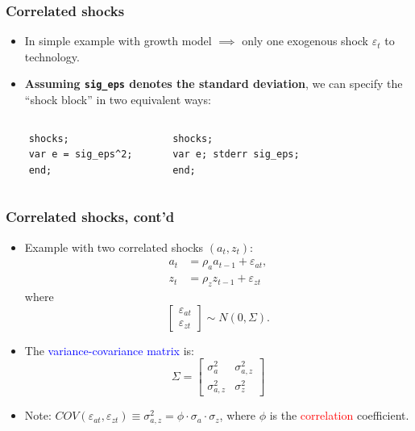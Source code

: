 \documentclass{beamer}
\newcommand{\eps}{\varepsilon}
\begin{document}
\begin{frame}[fragile]
\frametitle{Correlated shocks}

\begin{itemize}
\item In simple example with growth model $\implies $ only one exogenous
shock $\varepsilon _{t}$ to technology.

\item \textbf{Assuming \texttt{sig\_eps} denotes the standard deviation}, we can specify the ``shock block'' in two equivalent ways:
\end{itemize}

\begin{columns}[c]
	
	\begin{verbatim}
	shocks;
	var e = sig_eps^2;
	end;
	\end{verbatim}
	
	\begin{verbatim}
	shocks;
	var e; stderr sig_eps;
	end;
	\end{verbatim}

\end{columns}

\end{frame}

\begin{frame}
\frametitle{Correlated shocks, cont'd}
	\begin{itemize}
		\item Example with two correlated shocks $\left( a_{t},z_{t}\right) $:
		\begin{align*}
	    a_{t} &= \rho_{a}a_{t-1}+\eps_{at}, \\
	    z_{t} &= \rho_{z}z_{t-1}+\eps_{zt}
		\end{align*}
		where 
		\begin{equation*}
		\begin{bmatrix}
		\eps_{at} \\ 
		\eps_{zt}%
		\end{bmatrix}%
		\sim N\left( 0,\Sigma \right).
		\end{equation*}
		
		\item The \textcolor{blue}{variance-covariance matrix} is:
		\begin{equation*}
		\Sigma =%
		\begin{bmatrix}
		\sigma _{a}^{2} & \sigma _{a,z}^{2} \\ 
		\sigma _{a,z}^{2} & \sigma _{z }^{2}%
		\end{bmatrix}%
		\end{equation*}
		
		\item Note: $COV(\eps_{at},\eps_{zt})\equiv\sigma _{a,z}^{2}=\phi \cdot \sigma
		_{a}\cdot \sigma_{z}$, where $ \phi $ is the \textcolor{red}{correlation} coefficient.
	\end{itemize}

\end{frame}
\end{document}
